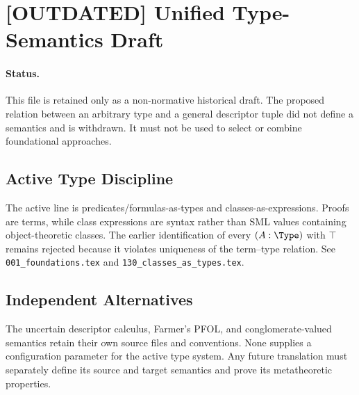 \def\topic{[OUTDATED] Unified Type Semantics}

\section{[OUTDATED] Unified Type-Semantics Draft}

\paragraph{Status.}
This file is retained only as a non-normative historical draft. The proposed
relation between an arbitrary type and a general descriptor tuple did not
define a semantics and is withdrawn. It must not be used to select or combine
foundational approaches.

\subsection{Active Type Discipline}
The active line is predicates/formulas-as-types and classes-as-expressions.
Proofs are terms, while class expressions are syntax rather than SML values
containing object-theoretic classes. The earlier identification of every
$(A:\Type)$ with $\top$ remains rejected because it violates uniqueness of the
term--type relation. See \texttt{001\_foundations.tex} and
\texttt{130\_classes\_as\_types.tex}.

\subsection{Independent Alternatives}
The uncertain descriptor calculus, Farmer's PFOL, and conglomerate-valued
semantics retain their own source files and conventions. None supplies a
configuration parameter for the active type system. Any future translation
must separately define its source and target semantics and prove its
metatheoretic properties.


